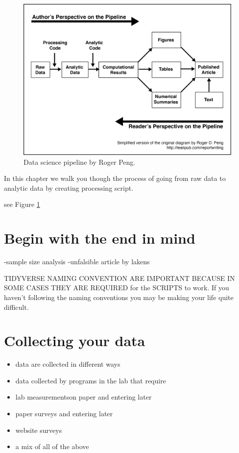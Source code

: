 \documentclass[
]{krantz}
\providecommand{\tightlist}{%
  \setlength{\itemsep}{0pt}\setlength{\parskip}{0pt}}
\begin{document}
\begin{figure}
\includegraphics[width=0.85\linewidth]{ch_score_items/images/pipeline} \caption{Data science pipeline by Roger Peng.}\label{fig:pipeline}
\end{figure}

In this chapter we walk you though the process of going from raw data to analytic data by creating processing script.

see Figure \ref{fig:pipeline}

\hypertarget{begin-with-the-end-in-mind}{%
\chapter{Begin with the end in mind}\label{begin-with-the-end-in-mind}}

-sample size analysis
-unfalsible article by lakens

TIDYVERSE NAMING CONVENTION ARE IMPORTANT BECAUSE IN SOME CASES THEY ARE REQUIRED for the SCRIPTS to work. If you haven't following the naming conventions you may be making your life quite difficult.

\hypertarget{collecting-your-data}{%
\chapter{Collecting your data}\label{collecting-your-data}}

\begin{itemize}
\tightlist
\item
  data are collected in different ways
\item
  data collected by programs in the lab that require
\item
  lab measurementson paper and entering later
\item
  paper surveys and entering later
\item
  website surveys
\item
  a mix of all of the above
\end{itemize}
\end{document}
